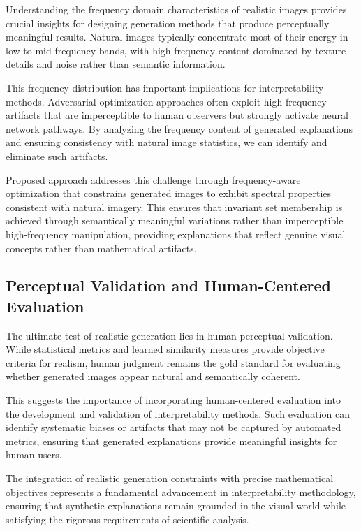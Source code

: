 \documentclass[licencjacka,en]{pracamgr}
\begin{document}
Understanding the frequency domain characteristics of realistic images provides crucial insights for designing generation methods that produce perceptually meaningful results. Natural images typically concentrate most of their energy in low-to-mid frequency bands, with high-frequency content dominated by texture details and noise rather than semantic information.

This frequency distribution has important implications for interpretability methods. Adversarial optimization approaches often exploit high-frequency artifacts that are imperceptible to human observers but strongly activate neural network pathways. By analyzing the frequency content of generated explanations and ensuring consistency with natural image statistics, we can identify and eliminate such artifacts.

Proposed approach addresses this challenge through frequency-aware optimization that constrains generated images to exhibit spectral properties consistent with natural imagery. This ensures that invariant set membership is achieved through semantically meaningful variations rather than imperceptible high-frequency manipulation, providing explanations that reflect genuine visual concepts rather than mathematical artifacts.

\subsection{Perceptual Validation and Human-Centered Evaluation}

The ultimate test of realistic generation lies in human perceptual validation. While statistical metrics and learned similarity measures provide objective criteria for realism, human judgment remains the gold standard for evaluating whether generated images appear natural and semantically coherent.

This suggests the importance of incorporating human-centered evaluation into the development and validation of interpretability methods. Such evaluation can identify systematic biases or artifacts that may not be captured by automated metrics, ensuring that generated explanations provide meaningful insights for human users.

The integration of realistic generation constraints with precise mathematical objectives represents a fundamental advancement in interpretability methodology, ensuring that synthetic explanations remain grounded in the visual world while satisfying the rigorous requirements of scientific analysis.
\end{document}
